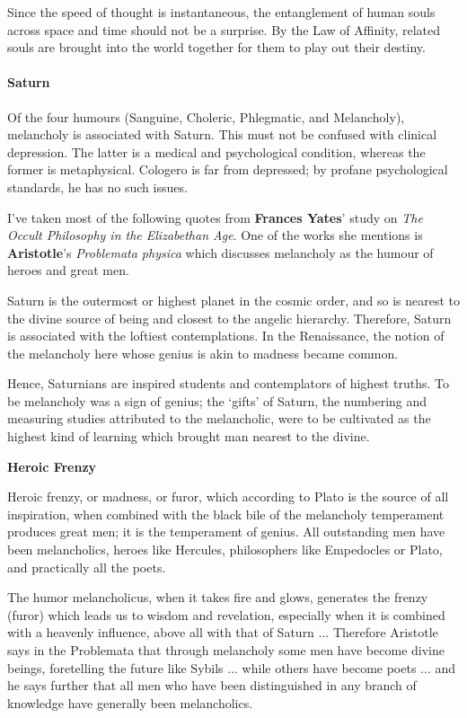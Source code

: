 Since the speed of thought is instantaneous, the entanglement of human souls across space and time should not be a surprise. By the Law of Affinity, related souls are brought into the world together for them to play out their destiny.

\paragraph{Saturn}


Of the four humours (Sanguine, Choleric, Phlegmatic, and Melancholy), melancholy is associated with Saturn. This must not be confused with clinical depression. The latter is a medical and psychological condition, whereas the former is metaphysical. Cologero is far from depressed; by profane psychological standards, he has no such issues.

I've taken most of the following quotes from \textbf{Frances Yates}' study on \emph{The Occult Philosophy in the Elizabethan Age}. One of the works she mentions is \textbf{Aristotle}'s \emph{Problemata physica} which discusses melancholy as the humour of heroes and great men.

Saturn is the outermost or highest planet in the cosmic order, and so is nearest to the divine source of being and closest to the angelic hierarchy. Therefore, Saturn is associated with the loftiest contemplations. In the Renaissance, the notion of the melancholy here whose genius is akin to madness became common.

Hence, Saturnians are inspired students and contemplators of highest truths. To be melancholy was a sign of genius; the `gifts' of Saturn, the numbering and measuring studies attributed to the melancholic, were to be cultivated as the highest kind of learning which brought man nearest to the divine.

\textbf{Heroic Frenzy}


Heroic frenzy, or madness, or furor, which according to Plato is the source of all inspiration, when combined with the black bile of the melancholy temperament produces great men; it is the temperament of genius. All outstanding men have been melancholics, heroes like Hercules, philosophers like Empedocles or Plato, and practically all the poets.

The humor melancholicus, when it takes fire and glows, generates the frenzy (furor) which leads us to wisdom and revelation, especially when it is combined with a heavenly influence, above all with that of Saturn ... Therefore Aristotle says in the Problemata that through melancholy some men have become divine beings, foretelling the future like Sybils ... while others have become poets ... and he says further that all men who have been distinguished in any branch of knowledge have generally been melancholics.

